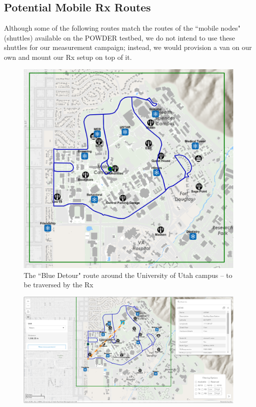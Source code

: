 \documentclass[12pt]{article}
\newcommand{\areaofinterestfigwidth}{1.0\textwidth}
\begin{document}
    \subsection{Potential Mobile Rx Routes}\label{S3.3}
    Although some of the following routes match the routes of the ``mobile nodes" (shuttles) available on the POWDER testbed, we do not intend to use these shuttles for our measurement campaign; instead, we would provision a van on our own and mount our Rx setup on top of it.
        \begin{itemize}
            \begin{figure}
                \centering
                \includegraphics[width=\areaofinterestfigwidth]{figs/Blue_Detour_Route_5.png}
                \caption{The ``Blue Detour" route around the University of Utah campus -- to be traversed by the Rx}
                \label{fig:Rx_1}
            \end{figure}
            \begin{figure}
                \centering
                \includegraphics[width=\areaofinterestfigwidth]{figs/Blue_Detour_Route_5_USTAR_Tx.png}

\end{figure}
\end{itemize}
\end{document}
